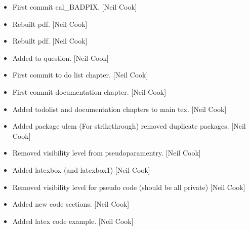 \documentclass[a4paper,10pt,english]{report}
\begin{document}
\begin{itemize}
\item {} 
First commit cal\_BADPIX. {[}Neil Cook{]}

\item {} 
Rebuilt pdf. {[}Neil Cook{]}

\item {} 
Rebuilt pdf. {[}Neil Cook{]}

\item {} 
Added to question. {[}Neil Cook{]}

\item {} 
First commit to do list chapter. {[}Neil Cook{]}

\item {} 
First commit documentation chapter. {[}Neil Cook{]}

\item {} 
Added todolist and documentation chapters to main tex. {[}Neil Cook{]}

\item {} 
Added package ulem (For strikethrough) removed duplicate packages.
{[}Neil Cook{]}

\item {} 
Removed visibility level from pseudoparamentry. {[}Neil Cook{]}

\item {} 
Added latexbox (and latexbox1) {[}Neil Cook{]}

\item {} 
Removed visibility level for pseudo code (should be all private) {[}Neil
Cook{]}

\item {} 
Added new code sections. {[}Neil Cook{]}

\item {} 
Added latex code example. {[}Neil Cook{]}

\end{itemize}
\end{document}
